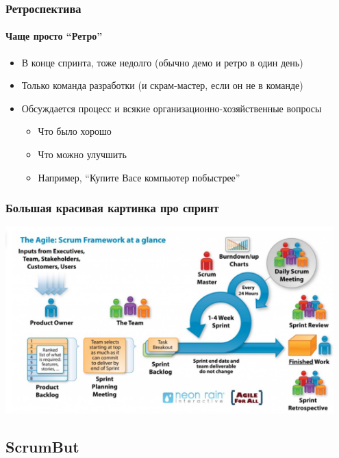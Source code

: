 \documentclass[xetex,mathserif,serif]{beamer}
\begin{document}
    \begin{frame}
        \frametitle{Ретроспектива}
        \framesubtitle{Чаще просто ``Ретро''}
        \begin{itemize}
            \item В конце спринта, тоже недолго (обычно демо и ретро в один день)
            \item Только команда разработки (и скрам-мастер, если он не в команде)
            \item Обсуждается процесс и всякие организационно-хозяйственные вопросы
            \begin{itemize}
                \item Что было хорошо
                \item Что можно улучшить
                \item Например, ``Купите Васе компьютер побыстрее''
            \end{itemize}
        \end{itemize}
    \end{frame}

    \begin{frame}
        \frametitle{Большая красивая картинка про спринт}
        \begin{center}
            \includegraphics[width=0.95\textwidth]{sprint.png}
        \end{center}
    \end{frame}

    \subsection{ScrumBut}
\end{document}
